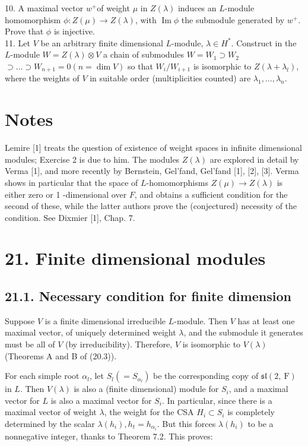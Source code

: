 \documentclass[10pt]{article}
\begin{document}
10. A maximal vector $w^{+}$of weight $\mu$ in $Z(\lambda)$ induces an $L$-module homomorphism $\phi: Z(\mu) \rightarrow Z(\lambda)$, with $\operatorname{Im} \phi$ the submodule generated by $w^{+}$. Prove that $\phi$ is injective.\\
11. Let $V$ be an arbitrary finite dimensional $L$-module, $\lambda \in H^{*}$. Construct in the $L$-module $W=Z(\lambda) \otimes V$ a chain of submodules $W=W_{1} \supset W_{2}$\\
$\supset \ldots \supset W_{n+1}=0(n=\operatorname{dim} V)$ so that $W_{i} / W_{i+1}$ is isomorphic to $Z\left(\lambda+\lambda_{l}\right)$, where the weights of $V$ in suitable order (multiplicities counted) are $\lambda_{1}, \ldots, \lambda_{n}$.

\section*{Notes}
Lemire [1] treats the question of existence of weight spaces in infinite dimensional modules; Exercise 2 is due to him. The modules $Z(\lambda)$ are explored in detail by Verma [1], and more recently by Bernstein, Gel'fand, Gel'fand [1], [2], [3]. Verma shows in particular that the space of $L$-homomorphisms $Z(\mu) \rightarrow Z(\lambda)$ is either zero or 1 -dimensional over $F$, and obtains a sufficient condition for the second of these, while the latter authors prove the (conjectured) necessity of the condition. See Dixmier [1], Chap. 7.

\section*{21. Finite dimensional modules}
\subsection*{21.1. Necessary condition for finite dimension}
Suppose $V$ is a finite dimensional irreducible $L$-module. Then $V$ has at least one maximal vector, of uniquely determined weight $\lambda$, and the submodule it generates must be all of $V$ (by irreducibility). Therefore, $V$ is isomorphic to $V(\lambda)$ (Theorems A and B of (20.3)).

For each simple root $\alpha_{l}$, let $S_{l}\left(=S_{\alpha_{l}}\right)$ be the corresponding copy of $\mathfrak{s l}(2, \mathrm{~F})$ in $L$. Then $V(\lambda)$ is also a (finite dimensional) module for $S_{i}$, and a maximal vector for $L$ is also a maximal vector for $S_{i}$. In particular, since there is a maximal vector of weight $\lambda$, the weight for the CSA $H_{i} \subset S_{i}$ is completely determined by the scalar $\lambda\left(h_{i}\right), h_{t}=h_{\alpha_{i}}$. But this forces $\lambda\left(h_{i}\right)$ to be a nonnegative integer, thanks to Theorem 7.2. This proves:
\end{document}
